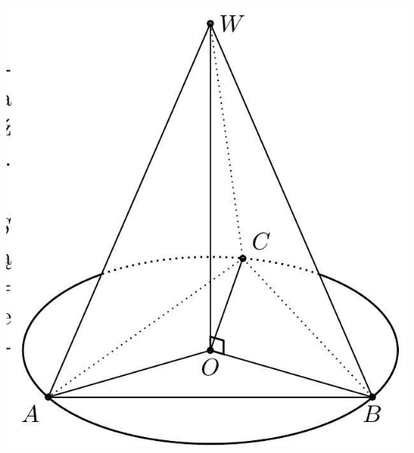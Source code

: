 \documentclass[10pt]{article}
\begin{document}
\begin{enumerate}
\includegraphics[max width=\textwidth, center]{2024_11_21_e9b4faa005d5be2cc318g-089}
\end{enumerate}
\end{document}
